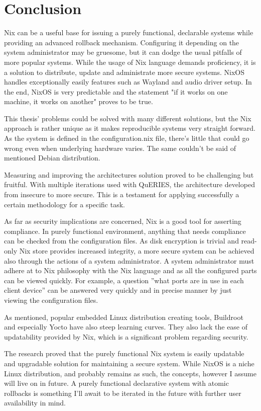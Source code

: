 \chapter{Conclusion} \label{conclusion}

Nix can be a useful base for issuing a purely functional, declarable
systems while providing an advanced rollback mechanism. Configuring it
depending on the system administrator may be gruesome, but it can
dodge the usual pitfalls of more popular systems. While the usage of
Nix language demands proficiency, it is a solution to distribute,
update and administrate more secure systems. NixOS handles
exceptionally easily features such as Wayland and audio driver
setup. In the end, NixOS is very predictable and the statement "if it
works on one machine, it works on another" proves to be true.

This thesis' problems could be solved with many different solutions,
but the Nix approach is rather unique as it makes reproducible systems
very straight forward. As the system is defined in the
configuration.nix file, there's little that could go wrong even when
underlying hardware varies. The same couldn't be said of mentioned
Debian distribution.

Measuring and improving the architectures solution proved to be
challenging but fruitful. With multiple iterations used with QuERIES,
the architecture developed from insecure to more secure. This is a
testament for applying successfully a certain methodology for a
specific task.

As far as security implications are concerned, Nix is a good tool for
asserting compliance. In purely functional environment, anything that
needs compliance can be checked from the configuration files. As disk
encryption is trivial and read-only Nix store provides increased
integrity, a more secure system can be achieved also through the
actions of a system administrator. A system administrator must adhere
at to Nix philosophy with the Nix language and as all the configured
parts can be viewed quickly. For example, a question ''what ports are
in use in each client device'' can be answered very quickly and in
precise manner by just viewing the configuration files.

As mentioned, popular embedded Linux distribution creating tools,
Buildroot and especially Yocto have also steep learning curves. They
also lack the ease of updatability provided by Nix, which is a
significant problem regarding security.

The research proved that the purely functional Nix system is easily
updatable and upgradable solution for maintaining a secure system.
While NixOS is a niche Linux distribution, and probably remains as
such, the concepts, however I assume will live on in future. A purely
functional declarative system with atomic rollbacks is something I'll
await to be iterated in the future with further user availability in
mind.
